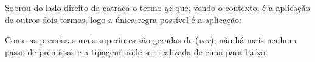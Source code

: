 \documentclass[../main.tex]{subfiles}
\begin{document}
Sobrou do lado direito da catraca o termo $yz$ que, vendo o contexto, é a aplicação de outros dois termos, logo a única regra possível é a aplicação:

\begin{prooftree}
\end{prooftree}

Como as premissas mais superiores são geradas de (\emph{var}), não há mais nenhum passo de premissas e a tipagem pode ser realizada de cima para baixo.

\begin{prooftree}
\end{prooftree}


\begin{prooftree}
\end{prooftree}

\begin{prooftree}
\end{prooftree}
\end{document}

